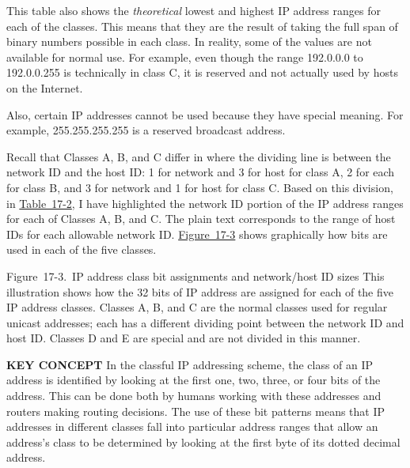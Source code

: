 This table also shows the {\emph{theoretical}} lowest and highest IP
address ranges for each of the classes. This means that they are the
result of taking the full span of binary numbers possible in each class.
In reality, some of the values are not available for normal use. For
example, even though the range 192.0.0.0 to 192.0.0.255 is technically
in class C, it is reserved and not actually used by hosts on the
Internet.

Also, certain IP addresses cannot be used because they have special
meaning. For example, 255.255.255.255 is a reserved broadcast address.

Recall that Classes A, B, and C differ in where the dividing line is
between the network ID and the host ID: 1 for network and 3 for host for
class A, 2 for each for class B, and 3 for network and 1 for host for
class C. Based on this division, in
\protect\hyperlink{ch17s02.htmlux5cux23ip_address_class_bit_patterns_first-octe}{Table~17-2},
I have highlighted the network ID portion of the IP address ranges for
each of Classes A, B, and C. The plain text corresponds to the range of
host IDs for each allowable network ID.
\protect\hyperlink{ch17s02.htmlux5cux23ip_address_class_bit_assignments_and_net}{Figure~17-3}
shows graphically how bits are used in each of the five classes.

\protect\hypertarget{ch17s02.htmlux5cux23ip_address_class_bit_assignments_and_net}{}{}

\protect\hypertarget{ch17s02.htmlux5cux23I_mediaobject3_d1e16900}{}{}

Figure~17-3.~IP address class bit assignments and network/host ID sizes
This illustration shows how the 32 bits of IP address are assigned for
each of the five IP address classes. Classes A, B, and C are the normal
classes used for regular unicast addresses; each has a different
dividing point between the network ID and host ID. Classes D and E are
special and are not divided in this manner.


{\textbf{KEY CONCEPT}} In the classful IP addressing scheme, the class
of an IP address is identified by looking at the first one, two, three,
or four bits of the address. This can be done both by humans working
with these addresses and routers making routing decisions. The use of
these bit patterns means that IP addresses in different classes fall
into particular address ranges that allow an address's class to be
determined by looking at the first byte of its dotted decimal
address.\protect\hypertarget{ch17s02.htmlux5cux23idx-CHP-17-0693}{}{}

